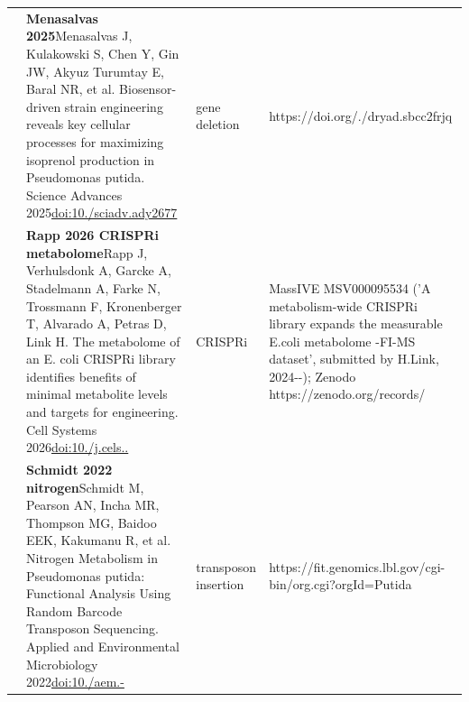 \begin{landscape}
\begin{longtable}{@{}r@{\hspace{4pt}} L{86mm} L{74mm} L{78mm}@{}}
 & \textbf{Menasalvas 2025}\newline Menasalvas J, Kulakowski S, Chen Y, Gin JW, Akyuz Turumtay E, Baral NR, et al. Biosensor-driven strain engineering reveals key cellular processes for maximizing isoprenol production in Pseudomonas putida. Science Advances 2025\newline \href{https://doi.org/10.1126/sciadv.ady2677}{doi:10./\allowbreak sciadv.\allowbreak ady2677} & gene deletion & https:/\allowbreak /\allowbreak doi.\allowbreak org/./\allowbreak dryad.\allowbreak sbcc2frjq \\
 & \textbf{Rapp 2026 CRISPRi metabolome}\newline Rapp J, Verhulsdonk A, Garcke A, Stadelmann A, Farke N, Trossmann F, Kronenberger T, Alvarado A, Petras D, Link H. The metabolome of an E. coli CRISPRi library identifies benefits of minimal metabolite levels and targets for engineering. Cell Systems 2026\newline \href{https://doi.org/10.1016/j.cels.2025.101518}{doi:10./\allowbreak j.\allowbreak cels..} & CRISPRi & MassIVE MSV000095534 ('A metabolism-\allowbreak wide CRISPRi library expands the measurable E.\allowbreak  coli metabolome -\allowbreak  FI-\allowbreak MS dataset', submitted by H.\allowbreak  Link, 2024--); Zenodo https:/\allowbreak /\allowbreak zenodo.\allowbreak org/\allowbreak records/ \\
 & \textbf{Schmidt 2022 nitrogen}\newline Schmidt M, Pearson AN, Incha MR, Thompson MG, Baidoo EEK, Kakumanu R, et al. Nitrogen Metabolism in Pseudomonas putida: Functional Analysis Using Random Barcode Transposon Sequencing. Applied and Environmental Microbiology 2022\newline \href{https://doi.org/10.1128/aem.02430-21}{doi:10./\allowbreak aem.-} & transposon insertion & https:/\allowbreak /\allowbreak fit.\allowbreak genomics.\allowbreak lbl.\allowbreak gov/\allowbreak cgi-\allowbreak bin/\allowbreak org.\allowbreak cgi?orgId=Putida \\

\end{longtable}
\end{landscape}
